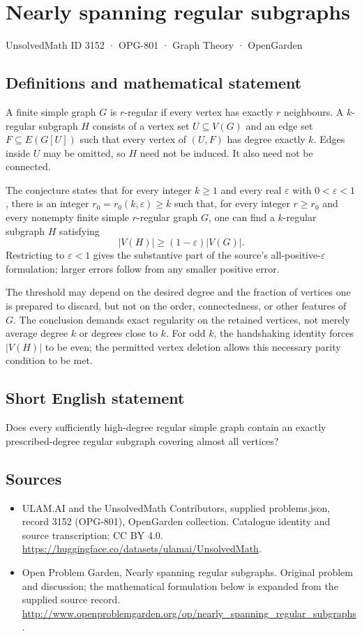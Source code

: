 \documentclass[11pt,a4paper]{article}
\begin{document}
\section*{Nearly spanning regular subgraphs}\label{3152}
{\small UnsolvedMath ID 3152 · OPG-801 · Graph Theory · OpenGarden}
\subsection{Definitions and mathematical statement}
A finite simple graph $G$ is $r$-regular if every vertex has exactly
$r$ neighbours. A $k$-regular subgraph $H$ consists of a vertex set
$U\subseteq V(G)$ and an edge set $F\subseteq E(G[U])$ such that
every vertex of $(U,F)$ has degree exactly $k$. Edges inside $U$
may be omitted, so $H$ need not be induced. It also need not be
connected.

The conjecture states that for every integer $k\geq1$ and every
real $\varepsilon$ with $0<\varepsilon<1$, there is an integer
$r_0=r_0(k,\varepsilon)\geq k$ such that, for every integer
$r\geq r_0$ and every nonempty finite simple $r$-regular graph $G$,
one can find a $k$-regular subgraph $H$ satisfying
\[
 |V(H)|\geq(1-\varepsilon)|V(G)|.
\]
Restricting to $\varepsilon<1$ gives the substantive part of the
source's all-positive-$\varepsilon$ formulation; larger errors
follow from any smaller positive error.

The threshold may depend on the desired degree and the fraction
of vertices one is prepared to discard, but not on the order,
connectedness, or other features of $G$. The conclusion demands
exact regularity on the retained vertices, not merely average
degree $k$ or degrees close to $k$. For odd $k$, the handshaking
identity forces $|V(H)|$ to be even; the permitted vertex deletion
allows this necessary parity condition to be met.
\subsection{Short English statement}
Does every sufficiently high-degree regular simple graph contain an exactly prescribed-degree regular subgraph covering almost all vertices?
\subsection{Sources}
\begin{itemize}
\item[S1] ULAM.AI and the UnsolvedMath Contributors, supplied problems.json, record 3152 (OPG-801), OpenGarden collection. Catalogue identity and source transcription; CC BY 4.0.
\url{https://huggingface.co/datasets/ulamai/UnsolvedMath}.
\item[S2] Open Problem Garden, Nearly spanning regular subgraphs. Original problem and discussion; the mathematical formulation below is expanded from the supplied source record.
\url{http://www.openproblemgarden.org/op/nearly_spanning_regular_subgraphs}.
\end{itemize}
\end{document}

